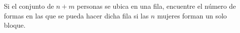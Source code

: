 Si el conjunto de \(n+m\) personas se ubica en una fila, encuentre el número de formas en las que se pueda hacer dicha fila si las \(n\) mujeres forman un solo bloque.

